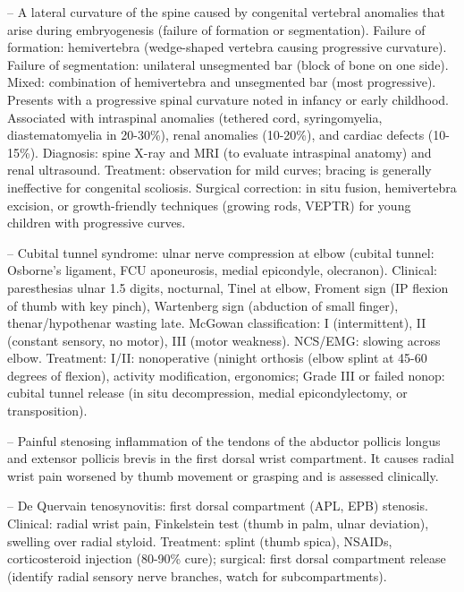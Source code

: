 -- A lateral curvature of the spine caused by congenital vertebral anomalies that arise during embryogenesis (failure of formation or segmentation). Failure of formation: hemivertebra (wedge-shaped vertebra causing progressive curvature). Failure of segmentation: unilateral unsegmented bar (block of bone on one side). Mixed: combination of hemivertebra and unsegmented bar (most progressive). Presents with a progressive spinal curvature noted in infancy or early childhood. Associated with intraspinal anomalies (tethered cord, syringomyelia, diastematomyelia in 20-30\%), renal anomalies (10-20\%), and cardiac defects (10-15\%). Diagnosis: spine X-ray and MRI (to evaluate intraspinal anatomy) and renal ultrasound. Treatment: observation for mild curves; bracing is generally ineffective for congenital scoliosis. Surgical correction: in situ fusion, hemivertebra excision, or growth-friendly techniques (growing rods, VEPTR) for young children with progressive curves.

-- Cubital tunnel syndrome: ulnar nerve compression at elbow (cubital tunnel: Osborne's ligament, FCU aponeurosis, medial epicondyle, olecranon). Clinical: paresthesias ulnar 1.5 digits, nocturnal, Tinel at elbow, Froment sign (IP flexion of thumb with key pinch), Wartenberg sign (abduction of small finger), thenar/hypothenar wasting late. McGowan classification: I (intermittent), II (constant sensory, no motor), III (motor weakness). NCS/EMG: slowing across elbow. Treatment: I/II: nonoperative (ninight orthosis (elbow splint at 45-60 degrees of flexion), activity modification, ergonomics; Grade III or failed nonop: cubital tunnel release (in situ decompression, medial epicondylectomy, or transposition).

-- Painful stenosing inflammation of the tendons of the abductor pollicis longus and extensor pollicis brevis in the first dorsal wrist compartment. It causes radial wrist pain worsened by thumb movement or grasping and is assessed clinically.

-- De Quervain tenosynovitis: first dorsal compartment (APL, EPB) stenosis. Clinical: radial wrist pain, Finkelstein test (thumb in palm, ulnar deviation), swelling over radial styloid. Treatment: splint (thumb spica), NSAIDs, corticosteroid injection (80-90\% cure); surgical: first dorsal compartment release (identify radial sensory nerve branches, watch for subcompartments).


